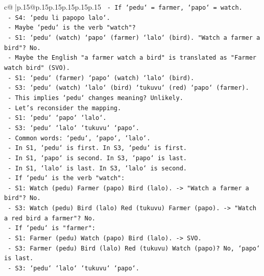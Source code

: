 \documentclass{article}
\begin{document}
{\begin{supertabular}{c@{$\;$}|p{.15\linewidth}@{}p{.15\linewidth}p{.15\linewidth}p{.15\linewidth}p{.15\linewidth}p{.15\linewidth}}
{{{\texttt{             {-} If `pedu` = farmer, `papo` = watch.} \\
\texttt{             {-} S4: `pedu li papopo lalo`.} \\
\texttt{             {-} Maybe `pedu` is the verb "watch"?} \\
\texttt{               {-} S1: `pedu` (watch) `papo` (farmer) `lalo` (bird). "Watch a farmer a bird"? No.} \\
\texttt{               {-} Maybe the English "a farmer watch a bird" is translated as "Farmer watch bird" (SVO).} \\
\texttt{               {-} S1: `pedu` (farmer) `papo` (watch) `lalo` (bird).} \\
\texttt{               {-} S3: `pedu` (watch) `lalo` (bird) `tukuvu` (red) `papo` (farmer).} \\
\texttt{               {-} This implies `pedu` changes meaning? Unlikely.} \\
\texttt{               {-} Let's reconsider the mapping.} \\
\texttt{               {-} S1: `pedu` `papo` `lalo`.} \\
\texttt{               {-} S3: `pedu` `lalo` `tukuvu` `papo`.} \\
\texttt{               {-} Common words: `pedu`, `papo`, `lalo`.} \\
\texttt{               {-} In S1, `pedu` is first. In S3, `pedu` is first.} \\
\texttt{               {-} In S1, `papo` is second. In S3, `papo` is last.} \\
\texttt{               {-} In S1, `lalo` is last. In S3, `lalo` is second.} \\
\texttt{               {-} If `pedu` is the verb "watch":} \\
\texttt{                 {-} S1: Watch (pedu) Farmer (papo) Bird (lalo). {-}> "Watch a farmer a bird"? No.} \\
\texttt{                 {-} S3: Watch (pedu) Bird (lalo) Red (tukuvu) Farmer (papo). {-}> "Watch a red bird a farmer"? No.} \\
\texttt{               {-} If `pedu` is "farmer":} \\
\texttt{                 {-} S1: Farmer (pedu) Watch (papo) Bird (lalo). {-}> SVO.} \\
\texttt{                 {-} S3: Farmer (pedu) Bird (lalo) Red (tukuvu) Watch (papo)? No, `papo` is last.} \\
\texttt{                 {-} S3: `pedu` `lalo` `tukuvu` `papo`.} \\
}}}
\end{supertabular}}
\end{document}
